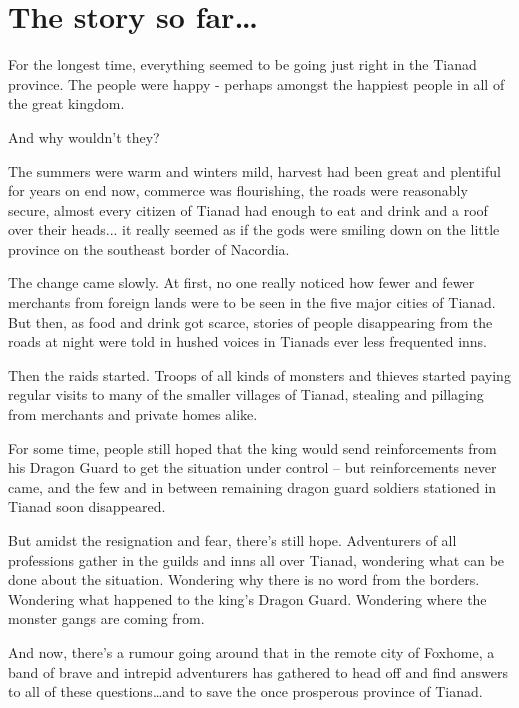 \documentclass[12pt]{scrbook}
\begin{document}
\chapter{The story so far\dots} 

For the longest time, everything seemed to be going just right in the Tianad province. The people were happy - perhaps amongst the happiest people in all of the great kingdom. 

And why wouldn't they? 

The summers were warm and winters mild, harvest had been great and plentiful for years on end now, commerce was flourishing, the roads were reasonably secure, almost every citizen of Tianad had enough to eat and drink and a roof over their heads... it really seemed as if the gods were smiling down on the little province on the southeast border of Nacordia. 

The change came slowly. At first, no one really noticed how fewer and fewer merchants from foreign lands were to be seen in the five major cities of Tianad. But then, as food and drink got scarce, stories of people disappearing from the roads at night were told in hushed voices in Tianads ever less frequented inns. 

Then the raids started. Troops of all kinds of monsters and thieves started paying regular visits to many of the smaller villages of Tianad, stealing and pillaging from merchants and private homes alike. 

For some time, people still hoped that the king would send reinforcements from his Dragon Guard to get the situation under control -- but reinforcements never came, and the few and in between remaining dragon guard soldiers stationed in Tianad soon disappeared. 

\medskip

But amidst the resignation and fear, there's still hope. Adventurers of all professions gather in the guilds and inns all over Tianad, wondering what can be done about the situation. Wondering why there is no word from the borders. Wondering what happened to the king's Dragon Guard. Wondering where the monster gangs are coming from.

And now, there's a rumour going around that in the remote city of Foxhome, a band of brave and intrepid adventurers has gathered to head off and find answers to all of these questions\dots and to save the once prosperous province of Tianad.
\end{document}
